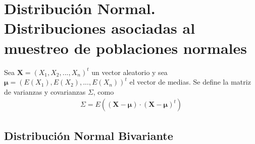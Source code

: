 \chapter{Distribución Normal. Distribuciones asociadas al muestreo de poblaciones normales}

\begin{defi}
    Sea $\textbf{X} = (X_1,X_2,...,X_n)^t$ un vector aleatorio y sea \\ $\boldsymbol{\mu} = (E(X_1),E(X_2),...,E(X_n))^t$ el vector de medias. Se define la matriz de varianzas y covarianzas $\Sigma$, como
    \begin{align*}
        \Sigma = E((\textbf{X} - \boldsymbol{\mu}) \cdot (\textbf{X} - \boldsymbol{\mu})^t)
    \end{align*}
\end{defi}

\section{Distribución Normal Bivariante}

